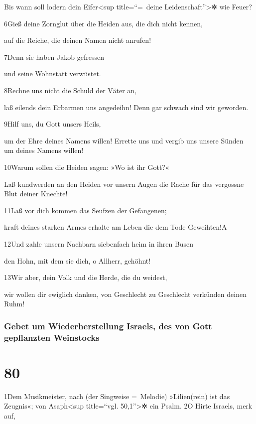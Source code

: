 Bis wann soll lodern dein Eifer\textless sup title=``=~deine
Leidenschaft''\textgreater✲ wie Feuer?

6Gieß deine Zornglut über die Heiden aus, die dich nicht kennen,

auf die Reiche, die deinen Namen nicht anrufen!

7Denn sie haben Jakob gefressen

und seine Wohnstatt verwüstet.

8Rechne uns nicht die Schuld der Väter an,

laß eilends dein Erbarmen uns angedeihn! Denn gar schwach sind wir
geworden.

9Hilf uns, du Gott unsers Heils,

um der Ehre deines Namens willen! Errette uns und vergib uns unsere
Sünden um deines Namens willen!

10Warum sollen die Heiden sagen: »Wo ist ihr Gott?«

Laß kundwerden an den Heiden vor unsern Augen die Rache für das
vergossne Blut deiner Knechte!

11Laß vor dich kommen das Seufzen der Gefangenen;

kraft deines starken Armes erhalte am Leben die dem Tode Geweihten!{A}

12Und zahle unsern Nachbarn siebenfach heim in ihren Busen

den Hohn, mit dem sie dich, o Allherr, gehöhnt!

13Wir aber, dein Volk und die Herde, die du weidest,

wir wollen dir ewiglich danken, von Geschlecht zu Geschlecht verkünden
deinen Ruhm!

\hypertarget{gebet-um-wiederherstellung-israels-des-von-gott-gepflanzten-weinstocks}{%
\subsubsection{Gebet um Wiederherstellung Israels, des von Gott
gepflanzten
Weinstocks}\label{gebet-um-wiederherstellung-israels-des-von-gott-gepflanzten-weinstocks}}

\hypertarget{section-79}{%
\section{80}\label{section-79}}

1Dem Musikmeister, nach (der Singweise =~Melodie) »Lilien(rein) ist das
Zeugnis«; von Asaph\textless sup title=``vgl. 50,1''\textgreater✲ ein
Psalm. 2O Hirte Israels, merk auf,

